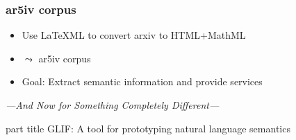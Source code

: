 \documentclass[aspectratio=169]{beamer}
\begin{document}
\begin{frame}[fragile]
    \frametitle{ar5iv corpus}
    \begin{itemize}
        \item Use LaTeXML to convert arxiv to HTML+MathML
        \item $\leadsto$ ar5iv corpus
        \item Goal: Extract semantic information and provide services
    \end{itemize}

    \vspace{1em}
    \centering
\end{frame}


\begin{frame}
    \centering
    \textit{---And Now for Something Completely Different---}
    
    \vspace{4em}

    \begin{beamercolorbox}[sep=4pt,center]{part title}
        GLIF: A tool for prototyping natural language semantics
      \par
    \end{beamercolorbox}
    \vspace{4em}
\end{frame}
\end{document}
